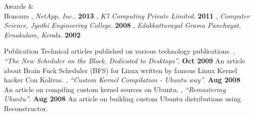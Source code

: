 \documentclass{resume}
\begin{document}

\begin{category}{Awards \&\\ Honours}
  , {\em NetApp, Inc.}. \hfill \textbf{2013}
  , {\em K7 Computing Private Limited}. \hfill \textbf{2011}
  , {\em Computer Science, Jyothi Engineering College}. \hfill \textbf{2008}
  , {\em Edakkattuvayal Grama Panchayat, Ernakulam, Kerala.} \hfill \textbf{2002}
\end{category}


\begin{category}{Publication}
  \citemnobullet Technical articles published on various technology publications.
  , {\em ``The New Scheduler on the Block, Dedicated to Desktops''}. \hfill \textbf{Oct 2009}
  \citemnobullet An article about Brain Fuck Scheduler (BFS) for Linux written by famous Linux Kernel hacker Con Kolivas.
  , {\em ``Custom Kernel Compilation - Ubuntu way''}. \hfill \textbf{Aug 2008}
  \citemnobullet An article on compiling custom kernel sources on Ubuntu.
  , {\em ``Remastering Ubuntu''}. \hfill \textbf{Aug 2008}
  \citemnobullet An article on building custom Ubuntu distributions using Reconstructor.
\end{category}


\end{document}
